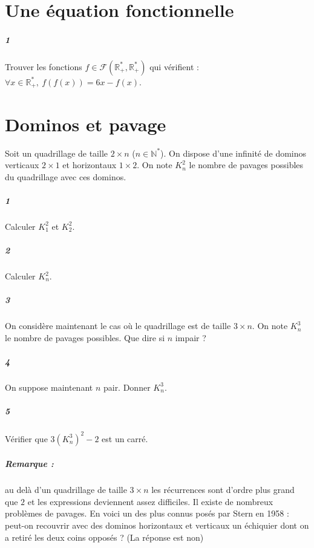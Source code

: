 \documentclass[10pt,a4paper]{article}
\begin{document}
\section{Une équation fonctionnelle}
\subparagraph{1}Trouver les fonctions $f \in \mathcal{F}\left( \mathbb{R}_+^*,\mathbb{R}_+^*\right)$ qui vérifient : $\forall x \in \mathbb{R}_+^*, \ f(f(x)) = 6x - f(x)$.

\section{Dominos et pavage}
Soit un quadrillage de taille $2 \times n$ ($n \in \mathbb{N}^*$). On dispose d'une infinité de dominos verticaux $2 \times 1$ et horizontaux $1 \times 2$. On note $K^2_n$ le nombre de pavages possibles du quadrillage avec ces dominos.
\subparagraph{1}Calculer $K^2_1$ et $K^2_2$. 
\subparagraph{2}Calculer $K^2_n$.
\subparagraph{3}On considère maintenant le cas où le quadrillage est de taille $3 \times n$. On note $K^3_n$ le nombre de pavages possibles. Que dire si $n$ impair ?
\subparagraph{4}On suppose maintenant $n$ pair. Donner $K^3_n$.
\subparagraph{5}Vérifier que $3(K^3_n)^2-2$ est un carré.
\subparagraph{Remarque :} au delà d'un quadrillage de taille $3 \times n$ les récurrences sont d'ordre plus grand que $2$ et les expressions deviennent assez difficiles. Il existe de nombreux problèmes de pavages. En voici un des plus connus posés par Stern en 1958 : peut-on recouvrir avec des dominos horizontaux et verticaux un échiquier dont on a retiré les deux coins opposés ? (La réponse est non)
\end{document}
